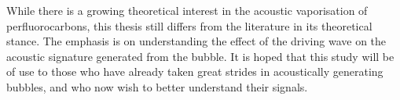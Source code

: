 
While there is a growing theoretical interest in the acoustic vaporisation of perfluorocarbons\cite{Sheeran2013,Doinikov2014,Shpak2013},
this thesis still differs from the literature in its theoretical stance.
The emphasis is on understanding the effect of the driving wave 
on the acoustic signature generated from the bubble.
It is hoped that this study will be of use 
to those who have already taken great strides in acoustically generating bubbles,
and who now wish to better understand their signals.














